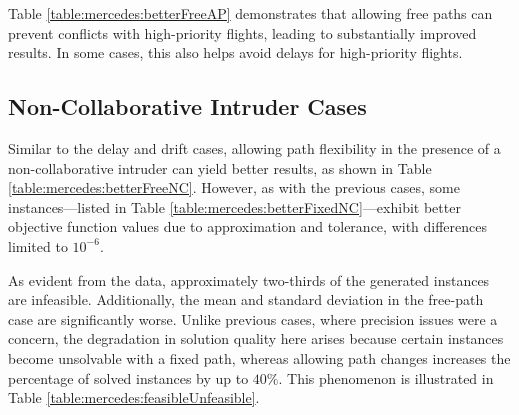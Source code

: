 \documentclass[../../../thesis.tex]{subfiles}
\begin{document}


Table \ref{table:mercedes:betterFreeAP} demonstrates that allowing free paths can prevent conflicts with high-priority flights, leading to substantially improved results. In some cases, this also helps avoid delays for high-priority flights.



\subsection{Non-Collaborative Intruder Cases}
Similar to the delay and drift cases, allowing path flexibility in the presence of a non-collaborative intruder can yield better results, as shown in Table \ref{table:mercedes:betterFreeNC}. However, as with the previous cases, some instances—listed in Table \ref{table:mercedes:betterFixedNC}—exhibit better objective function values due to approximation and tolerance, with differences limited to $10^{-6}$.




As evident from the data, approximately two-thirds of the generated instances are infeasible. Additionally, the mean and standard deviation in the free-path case are significantly worse. Unlike previous cases, where precision issues were a concern, the degradation in solution quality here arises because certain instances become unsolvable with a fixed path, whereas allowing path changes increases the percentage of solved instances by up to $40\%$. This phenomenon is illustrated in Table \ref{table:mercedes:feasibleUnfeasible}.


\end{document}
